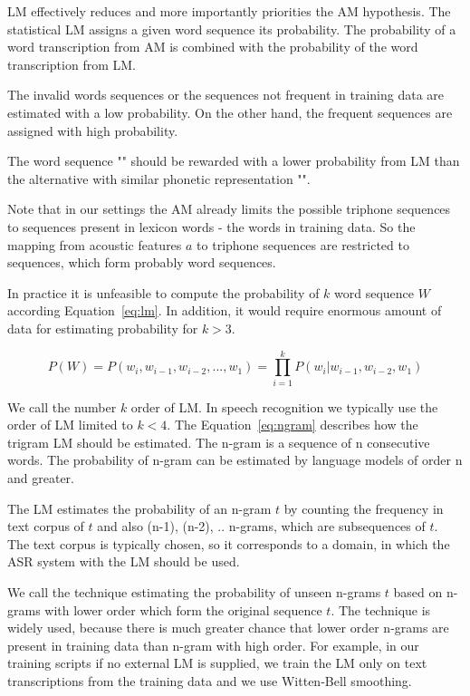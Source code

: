 {\ac{LM} effectively reduces and more importantly priorities the \ac{AM} hypothesis.
The statistical \ac{LM} assigns a given word sequence its probability.
The probability of a word transcription from \ac{AM} is combined with the probability of the word transcription from \ac{LM}.

The invalid words sequences or the sequences not frequent in training data are estimated with a low probability. 
On the other hand, the frequent sequences are assigned with high probability.

The word sequence "" should be rewarded with a lower probability from \ac{LM} than the alternative with similar phonetic representation "".

Note that in our settings the \ac{AM} already limits the possible triphone sequences to sequences present in lexicon words - the words in training data.
So the mapping from acoustic features $a$ to triphone sequences are restricted to sequences, which form probably word sequences.

In practice it is unfeasible to compute the probability of $k$ word sequence $W$ according Equation~\ref{eq:lm}.
In addition, it would require enormous amount of data for estimating probability for $k>3$.


\begin{equation} \label{eq:lm}
    P(W)=P(w_i,  w_{i-1}, w_{i-2}, ..., w_1)=\prod_{i=1}^{k}{P(w_i|w_{i-1}, w_{i-2}, w_1)}
\end{equation}

We call the number $k$ order of \ac{LM}.
In speech recognition we typically use the order of \ac{LM} limited to $k<4$.
The Equation~\ref{eq:ngram} describes how the trigram \ac{LM} should be estimated.
The n-gram is a sequence of n consecutive words. The probability of n-gram can be estimated by language models
of order n and greater.

The \ac{LM} estimates the probability of an n-gram $t$ by counting the frequency in text corpus of $t$ and 
also (n-1), (n-2), .. n-grams, which are subsequences of $t$.
The text corpus is typically chosen, so it corresponds to a domain, in which the \ac{ASR} system 
with the \ac{LM} should be used.

We call the  technique estimating the probability of unseen n-grams $t$ 
based on n-grams with lower order which form the original sequence $t$.
The technique is widely used, because there is much greater chance that lower order n-grams are
present in training data than n-gram with high order.
For example, in our training scripts if no external \ac{LM} is supplied,
we train the \ac{LM} only on text transcriptions from the training data
and we use Witten-Bell smoothing.\cite{witten1991zero}

}
